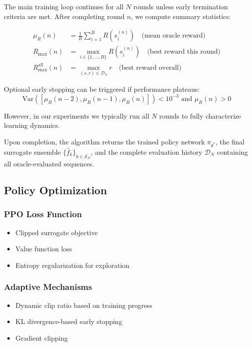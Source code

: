 \documentclass[conference]{IEEEtran}
\begin{document}
The main training loop continues for all $N$ rounds unless early termination criteria are met. After completing round $n$, we compute summary statistics:

\begin{align}
\mu_R(n) &= \frac{1}{B}\sum_{i=1}^{B} R(s_i^{(n)}) \quad \text{(mean oracle reward)} \\
R_{\max}(n) &= \max_{i \in \{1,\ldots,B\}} R(s_i^{(n)}) \quad \text{(best reward this round)} \\
R_{\max}^{\text{all}}(n) &= \max_{(s,r) \in \mathcal{D}_n} r \quad \text{(best reward overall)}
\end{align}

Optional early stopping can be triggered if performance plateaus:
\begin{equation}
\text{Var}([\mu_R(n-2), \mu_R(n-1), \mu_R(n)]) < 10^{-3} \text{ and } \mu_R(n) > 0
\end{equation}

However, in our experiments we typically run all $N$ rounds to fully characterize learning dynamics.

Upon completion, the algorithm returns the trained policy network $\pi_{\theta^*}$, the final surrogate ensemble $\{\hat{f}_k\}_{k \in \mathcal{S}_N}$, and the complete evaluation history $\mathcal{D}_N$ containing all oracle-evaluated sequences.






\subsection{Policy Optimization}
\subsubsection{PPO Loss Function}
\begin{itemize}
    \item Clipped surrogate objective
    \item Value function loss
    \item Entropy regularization for exploration
\end{itemize}

\subsubsection{Adaptive Mechanisms}
\begin{itemize}
    \item Dynamic clip ratio based on training progress
    \item KL divergence-based early stopping
    \item Gradient clipping
\end{itemize}
\end{document}
